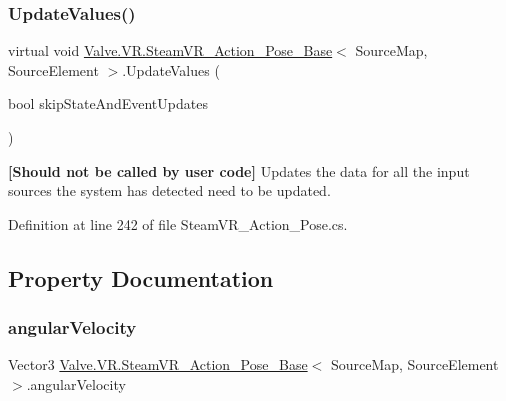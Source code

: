 \subsubsection{\texorpdfstring{UpdateValues()}{UpdateValues()}}
{\footnotesize\ttfamily virtual void \mbox{\hyperlink{class_valve_1_1_v_r_1_1_steam_v_r___action___pose___base}{Valve.\+V\+R.\+Steam\+V\+R\+\_\+\+Action\+\_\+\+Pose\+\_\+\+Base}}$<$ Source\+Map, Source\+Element $>$.Update\+Values (\begin{DoxyParamCaption}\item[{bool}]{skip\+State\+And\+Event\+Updates }\end{DoxyParamCaption})\hspace{0.3cm}{\ttfamily [virtual]}}



{\bfseries{\mbox{[}Should not be called by user code\mbox{]}}} Updates the data for all the input sources the system has detected need to be updated. 



Definition at line 242 of file Steam\+V\+R\+\_\+\+Action\+\_\+\+Pose.\+cs.



\subsection{Property Documentation}
\mbox{\label{class_valve_1_1_v_r_1_1_steam_v_r___action___pose___base_a84bf81feaa02463f8151e1ea25e16825}} 
\subsubsection{\texorpdfstring{angularVelocity}{angularVelocity}}
{\footnotesize\ttfamily Vector3 \mbox{\hyperlink{class_valve_1_1_v_r_1_1_steam_v_r___action___pose___base}{Valve.\+V\+R.\+Steam\+V\+R\+\_\+\+Action\+\_\+\+Pose\+\_\+\+Base}}$<$ Source\+Map, Source\+Element $>$.angular\+Velocity\hspace{0.3cm}{\ttfamily [get]}}



